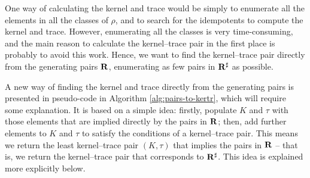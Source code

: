 One way of calculating the kernel and trace would be simply to enumerate all the
elements in all the classes of $\rho$, and to search for the idempotents to
compute the kernel and trace.  However, enumerating all the classes is very
time-consuming, and the main reason to calculate the kernel--trace pair in the
first place is probably to avoid this work.  Hence, we want to find the
kernel--trace pair directly from the generating pairs $\mathbf{R}$, enumerating
as few pairs in $\mathbf{R}^\sharp$ as possible.

A new way of finding the kernel and trace directly from the generating pairs is
presented in pseudo-code in Algorithm \ref{alg:pairs-to-kertr}, which will
require some explanation.  It is based on a simple idea: firstly, populate $K$
and $\tau$ with those elements that are implied directly by the pairs in
$\mathbf{R}$; then, add further elements to $K$ and $\tau$ to satisfy the
conditions of a kernel--trace pair.  This means we return the least kernel--trace
pair $(K, \tau)$ that implies the pairs in $\mathbf{R}$ -- that is, we return
the kernel--trace pair that corresponds to $\mathbf{R}^\sharp$.  This idea is
explained more explicitly below.

